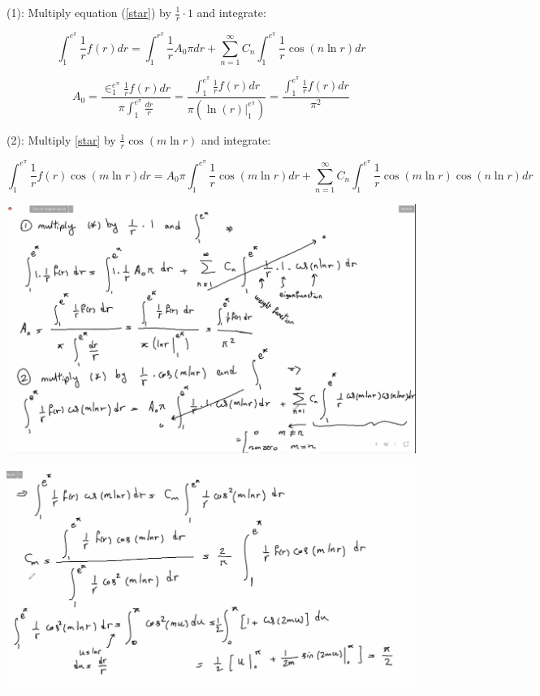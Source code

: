 \documentclass{article}
\begin{document}
(1): Multiply equation (\ref{star}) by $\frac{1}{r} \cdot 1$ and integrate:

$$\int_1^{e^\pi} \frac{1}{r} f(r) dr = \int_1^{r^\pi} \frac{1}{r} A_0 \pi dr + \sum_{n=1}^\infty C_n \int_1^{e^\pi} \frac{1}{r} \cos(n \ln r) dr$$

$$A_0 = \frac{\in_1^{e^\pi} \frac{1}{r} f(r) dr}{\pi \int_1^{e^\pi} \frac{dr}{r}} = \frac{\int_1^{e^\pi} \frac{1}{r} f(r) dr}{\pi \left( \left. \ln(r) \right|_1^{e^\pi} \right)} = \frac{\int_1^{e^\pi} \frac{1}{r} f(r) dr}{\pi^2}$$

(2): Multiply \ref{star} by $\frac{1}{r} \cos(m \ln r)$ and integrate:

$$\int_1^{e^\pi} \frac{1}{r} f(r) \cos(m \ln r) dr = A_0 \pi \int_1^{e^\pi} \frac{1}{r} \cos(m \ln r) dr + \sum_{n=1}^\infty C_n \int_1^{e^\pi} \frac{1}{r} \cos(m \ln r) \cos(n \ln r) dr$$


\begin{center}
    \includegraphics[width = 0.9 \textwidth]{8.png}
\end{center}

\begin{center}
    \includegraphics[width = 0.9 \textwidth]{10.png}
\end{center}
\end{document}
